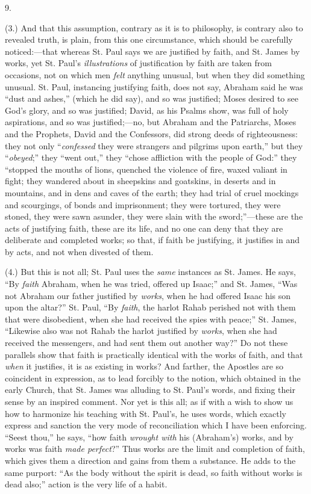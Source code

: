 9.

(3.) And that this assumption, contrary as it is to philosophy, is
contrary also to revealed truth, is plain, from this one circumstance,
which should be carefully noticed:—that whereas St. Paul says we are
justified by faith, and St. James by works, yet St. Paul's \emph{illustrations}
of justification by faith are taken from occasions, not on which
men \emph{felt} anything unusual, but when they did something unusual.
St. Paul, instancing justifying faith, does not say, Abraham said he
was ``dust and ashes,'' (which he did say), and so was
justified; Moses desired to see God's glory, and so was justified;
David, as his Psalms show, was full of holy aspirations, and so was
justified;—no, but Abraham and the Patriarchs, Moses and the
Prophets, David and the Confessors, did strong deeds of righteousness:
they not only ``\emph{confessed} they were strangers and pilgrims
upon earth,'' but they ``\emph{obeyed};'' they ``went
out,'' they ``chose affliction with the people of God:''
they ``stopped the mouths of lions, quenched the violence of fire,
waxed valiant in fight; they wandered about in sheepskins and
goatskins, in deserts and in mountains, and in dens and caves of the
earth; they had trial of cruel mockings and scourgings, of bonds and
imprisonment; they were tortured, they were stoned, they were sawn
asunder, they were slain with the sword;''—these are the acts of
justifying faith, these are its life, and no one can deny that they
are deliberate and completed works; so that, if faith be justifying,
it justifies in and by acts, and not when divested of them.

(4.) But this is not all; St. Paul uses the \emph{same} instances
as St. James. He says, ``By \emph{faith} Abraham, when he was
tried, offered up Isaac;'' and St. James, ``Was not Abraham
our father justified by \emph{works}, when he had offered Isaac his
son upon the altar?'' St. Paul, ``By \emph{faith}, the harlot Rahab
perished not with them that were disobedient, when she had received
the spies with peace;'' St. James, ``Likewise also was not
Rahab the harlot justified by \emph{works}, when she had
received the messengers, and had sent them out another way?'' Do
not these parallels show that faith is practically identical with the
works of faith, and that \emph{when} it justifies, it is as existing
in works? And farther, the Apostles are so coincident in expression,
as to lead forcibly to the notion, which obtained in the early Church,
that St. James was alluding to St. Paul's words, and fixing their
sense by an inspired comment. Nor yet is this all; as if with a wish
to show us how to harmonize his teaching with St. Paul's, he uses
words, which exactly express and sanction the very mode of
reconciliation which I have been enforcing. ``Seest thou,'' he
says, ``how faith \emph{wrought with} his (Abraham's) works, and
by works was faith \emph{made perfect}?'' Thus works are the limit
and completion of faith, which gives them a direction and gains from
them a substance. He adds to the same purport: ``As the body
without the spirit is dead, so faith without works is dead also;''
action is the very life of a habit.

